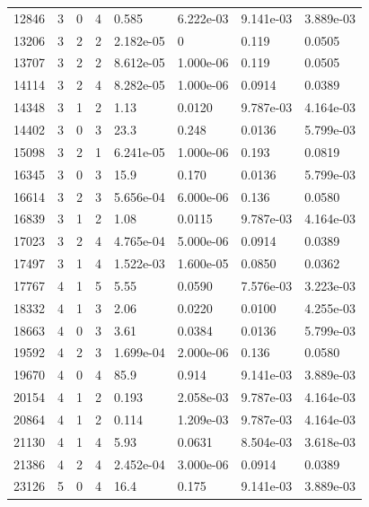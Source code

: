 \documentclass[preview]{standalone}
\begin{document}
{{{\begin{tabular}{L{1.2cm}C{1.2cm} C{0.3cm}C{0.5cm} C{1.4cm}C{1.4cm} C{1.4cm}C{1.4cm}}
  12846  &     3  & 0     &  4 &  0.585  & 6.222e-03  & 9.141e-03 &  3.889e-03   \\ 
  13206  &     3  & 2     &  2 &  2.182e-05  & 0  & 0.119 &  0.0505   \\ 
  13707  &     3  & 2     &  2 &  8.612e-05  & 1.000e-06  & 0.119 &  0.0505   \\ 
  14114  &     3  & 2     &  4 &  8.282e-05  & 1.000e-06  & 0.0914 &  0.0389   \\ 
  14348  &     3  & 1     &  2 &  1.13  & 0.0120  & 9.787e-03 &  4.164e-03   \\ 
  14402  &     3  & 0     &  3 &  23.3  & 0.248  & 0.0136 &  5.799e-03   \\ 
  15098  &     3  & 2     &  1 &  6.241e-05  & 1.000e-06  & 0.193 &  0.0819   \\ 
  16345  &     3  & 0     &  3 &  15.9  & 0.170  & 0.0136 &  5.799e-03   \\ 
  16614  &     3  & 2     &  3 &  5.656e-04  & 6.000e-06  & 0.136 &  0.0580   \\ 
  16839  &     3  & 1     &  2 &  1.08  & 0.0115  & 9.787e-03 &  4.164e-03   \\ 
  17023  &     3  & 2     &  4 &  4.765e-04  & 5.000e-06  & 0.0914 &  0.0389   \\ 
  17497  &     3  & 1     &  4 &  1.522e-03  & 1.600e-05  & 0.0850 &  0.0362   \\ 
  17767  &     4  & 1     &  5 &  5.55  & 0.0590  & 7.576e-03 &  3.223e-03   \\ 
  18332  &     4  & 1     &  3 &  2.06  & 0.0220  & 0.0100 &  4.255e-03   \\ 
  18663  &     4  & 0     &  3 &  3.61  & 0.0384  & 0.0136 &  5.799e-03   \\ 
  19592  &     4  & 2     &  3 &  1.699e-04  & 2.000e-06  & 0.136 &  0.0580   \\ 
  19670  &     4  & 0     &  4 &  85.9  & 0.914  & 9.141e-03 &  3.889e-03   \\ 
  20154  &     4  & 1     &  2 &  0.193  & 2.058e-03  & 9.787e-03 &  4.164e-03   \\ 
  20864  &     4  & 1     &  2 &  0.114  & 1.209e-03  & 9.787e-03 &  4.164e-03   \\ 
  21130  &     4  & 1     &  4 &  5.93  & 0.0631  & 8.504e-03 &  3.618e-03   \\ 
  21386  &     4  & 2     &  4 &  2.452e-04  & 3.000e-06  & 0.0914 &  0.0389   \\ 
  23126  &     5  & 0     &  4 &  16.4  & 0.175  & 9.141e-03 &  3.889e-03   \\ 

\end{tabular}}}}
\end{document}
